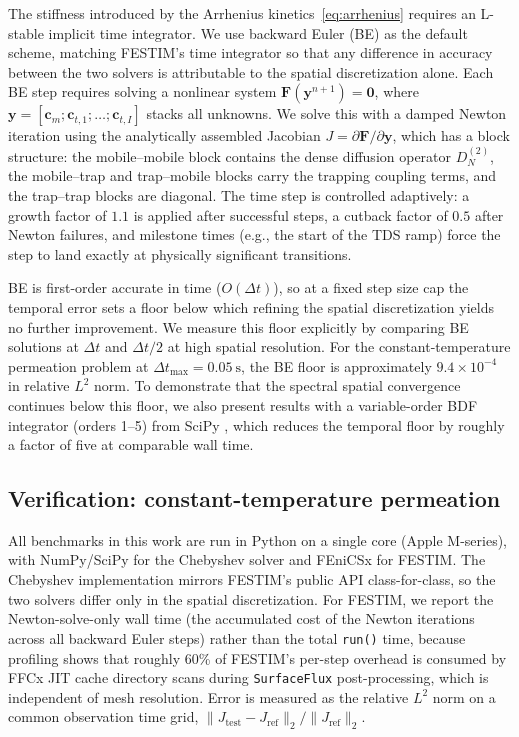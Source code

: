 The stiffness introduced by the Arrhenius kinetics~\eqref{eq:arrhenius} requires an L-stable implicit time integrator. We use backward Euler (BE) as the default scheme, matching FESTIM's time integrator so that any difference in accuracy between the two solvers is attributable to the spatial discretization alone. Each BE step requires solving a nonlinear system $\mathbf{F}(\mathbf{y}^{n+1}) = \mathbf{0}$, where $\mathbf{y} = [\mathbf{c}_m; \mathbf{c}_{t,1}; \ldots; \mathbf{c}_{t,I}]$ stacks all unknowns. We solve this with a damped Newton iteration using the analytically assembled Jacobian $J = \partial\mathbf{F}/\partial\mathbf{y}$, which has a block structure: the mobile--mobile block contains the dense diffusion operator $D_N^{(2)}$, the mobile--trap and trap--mobile blocks carry the trapping coupling terms, and the trap--trap blocks are diagonal. The time step is controlled adaptively: a growth factor of $1.1$ is applied after successful steps, a cutback factor of $0.5$ after Newton failures, and milestone times (e.g., the start of the TDS ramp) force the step to land exactly at physically significant transitions.

BE is first-order accurate in time ($O(\Delta t)$), so at a fixed step size cap the temporal error sets a floor below which refining the spatial discretization yields no further improvement. We measure this floor explicitly by comparing BE solutions at $\Delta t$ and $\Delta t/2$ at high spatial resolution. For the constant-temperature permeation problem at $\Delta t_{\max} = \SI{0.05}{\second}$, the BE floor is approximately $9.4\times 10^{-4}$ in relative $L^2$ norm. To demonstrate that the spectral spatial convergence continues below this floor, we also present results with a variable-order BDF integrator (orders 1--5) from SciPy \cite{virtanen2020}, which reduces the temporal floor by roughly a factor of five at comparable wall time.

\subsection{Verification: constant-temperature permeation}\label{sec:verification}

All benchmarks in this work are run in Python on a single core (Apple M-series), with NumPy/SciPy for the Chebyshev solver and FEniCSx for FESTIM. The Chebyshev implementation mirrors FESTIM's public API class-for-class, so the two solvers differ only in the spatial discretization. For FESTIM, we report the Newton-solve-only wall time (the accumulated cost of the Newton iterations across all backward Euler steps) rather than the total \texttt{run()} time, because profiling shows that roughly 60\% of FESTIM's per-step overhead is consumed by FFCx JIT cache directory scans during \texttt{SurfaceFlux} post-processing, which is independent of mesh resolution. Error is measured as the relative $L^2$ norm on a common observation time grid, $\|J_\text{test} - J_\text{ref}\|_2 / \|J_\text{ref}\|_2$.

